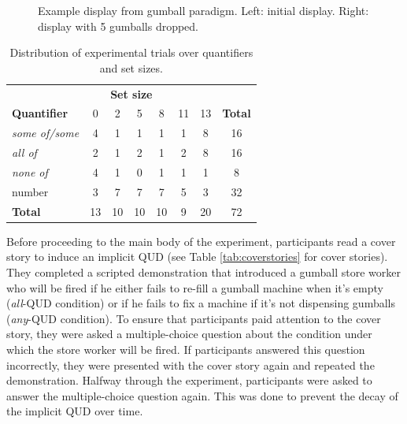 \documentclass[10pt,letterpaper]{article}
\begin{document}
\begin{figure}
\centering
{}
\caption{Example display from gumball paradigm. Left: initial display. Right: display with 5 gumballs dropped.  \label{fig:gumball-paradigm}}
\end{figure}


  \begin{table}
      \begin{tabular}{lccccccc}
      \midrule
      \multicolumn{8}{c}{\textbf{Set size}} \\
      \textbf{Quantifier} & 0 & 2 & 5 & 8 & 11 & 13 & \multicolumn{1}{l}{\textbf{Total}} \\
      \midrule
      \textit{some of/some} & 4 & 1 & 1 & 1 & 1 & 8 & 16 \\
      \textit{all of} & 2 & 1 & 2 & 1 & 2 & 8 & 16 \\
      \textit{none of} & 4 & 1 & 0 & 1 & 1 & 1 & 8 \\
      number & 3 & 7 & 7 & 7 & 5 & 3 & 32 \\
      \bottomrule
      \textbf{Total} & 13 & 10 & 10 & 10 & 9 & 20 & 72
      \end{tabular}
    \caption{Distribution of experimental trials over quantifiers and set sizes. \label{tab:stimuli}}
  \end{table}
  
Before proceeding to the main body of the experiment, participants read a cover story to induce an implicit QUD (see Table \ref{tab:coverstories} for cover stories). They completed a scripted demonstration that introduced a gumball store worker who will be fired if he either fails to re-fill a gumball machine when it's empty (\emph{all}-QUD condition) or if he fails to fix a machine if it's not dispensing gumballs (\emph{any}-QUD condition). To ensure that participants paid attention to the cover story, they were asked a multiple-choice question about the condition under which the store worker will be fired. If participants answered this question incorrectly, they were presented with the cover story again and repeated the demonstration. Halfway through the experiment, participants were asked to answer the multiple-choice question again. This was done to prevent the decay of the implicit QUD over time.  
  
\end{document}
